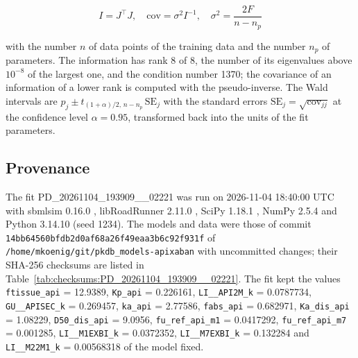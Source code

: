 \documentclass{article}
\begin{document}
\begin{equation}
I = J^\top J, \quad \mathrm{cov} = \sigma^2 I^{-1}, \quad \sigma^2 = \frac{2 F}{n - n_p}
\end{equation}

with the number $n$ of data points of the training data and the number $n_p$ of parameters. The information has rank 8 of 8, the number of its eigenvalues above $10^{-8}$ of the largest one, and the condition number 1370; the covariance of an information of a lower rank is computed with the pseudo-inverse. The Wald intervals are $\hat{p}_j \pm t_{(1+\alpha)/2,\, n-n_p}\, \mathrm{SE}_j$ with the standard errors $\mathrm{SE}_j = \sqrt{\mathrm{cov}_{jj}}$ at the confidence level $\alpha = 0.95$, transformed back into the units of the fit parameters.

\subsection{Provenance}

The fit PD\_20261104\_193909\_\_02221 was run on 2026-11-04 18:40:00 UTC with sbmlsim 0.16.0 \cite{Koenig2026_sbmlsim}, libRoadRunner 2.11.0 \cite{Welsh2023}, SciPy 1.18.1 \cite{Virtanen2020}, NumPy 2.5.4 \cite{Harris2020} and Python 3.14.10 (seed 1234). The models and data were those of commit \texttt{14bb64560bfdb2d0af68a26f49eaa3b6c92f931f} of \texttt{/home/mkoenig/git/pkdb\_models-apixaban} with uncommitted changes; their SHA-256 checksums are listed in Table~\ref{tab:checksums:PD_20261104_193909__02221}. The fit kept the values \texttt{ftissue\_api} = 12.9389, \texttt{Kp\_api} = 0.226161, \texttt{LI\_\_API2M\_k} = 0.0787734, \texttt{GU\_\_APISEC\_k} = 0.269457, \texttt{ka\_api} = 2.77586, \texttt{fabs\_api} = 0.682971, \texttt{Ka\_dis\_api} = 1.08229, \texttt{D50\_dis\_api} = 9.0956, \texttt{fu\_ref\_api\_m1} = 0.0417292, \texttt{fu\_ref\_api\_m7} = 0.001285, \texttt{LI\_\_M1EXBI\_k} = 0.0372352, \texttt{LI\_\_M7EXBI\_k} = 0.132284 and \texttt{LI\_\_M22M1\_k} = 0.00568318 of the model fixed.
\end{document}
